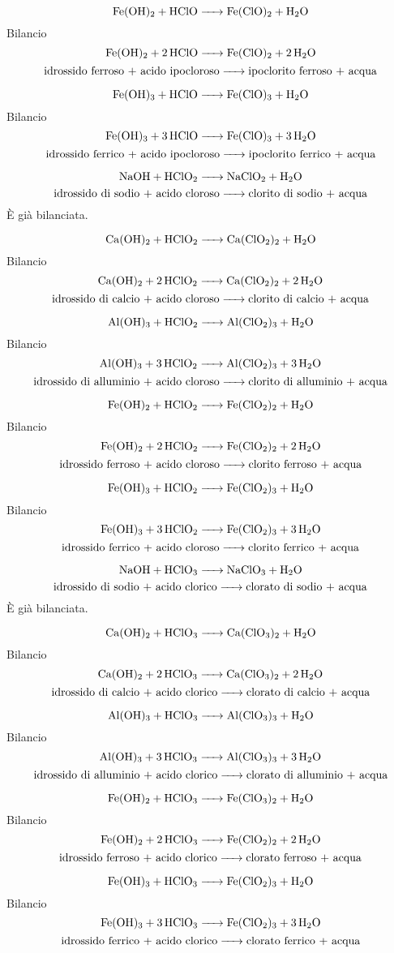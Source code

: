 $$\ce{Fe(OH)_2 + HClO -> Fe(ClO)_2 + H_2O}$$Bilancio
$$\ce{Fe(OH)_2 + 2 HClO -> Fe(ClO)_2 + 2 H_2O}$$
$$\text{idrossido ferroso + acido ipocloroso}\ce{->}\text{ipoclorito ferroso + acqua}$$

$$\ce{Fe(OH)_3 + HClO -> Fe(ClO)_3 + H_2O}$$Bilancio
$$\ce{Fe(OH)_3 + 3 HClO -> Fe(ClO)_3 + 3 H_2O}$$
$$\text{idrossido ferrico + acido ipocloroso}\ce{->}\text{ipoclorito ferrico + acqua}$$

$$\ce{NaOH + HClO_2 -> NaClO_2 + H_2O}$$
$$\text{idrossido di sodio + acido cloroso}\ce{->}\text{clorito di sodio + acqua}$$
È già bilanciata.

$$\ce{Ca(OH)_2 + HClO_2 -> Ca(ClO_2)_2 + H_2O}$$Bilancio
$$\ce{Ca(OH)_2 + 2 HClO_2 -> Ca(ClO_2)_2 + 2 H_2O}$$
$$\text{idrossido di calcio + acido cloroso}\ce{->}\text{clorito di calcio + acqua}$$

$$\ce{Al(OH)_3 + HClO_2 -> Al(ClO_2)_3 + H_2O}$$Bilancio
$$\ce{Al(OH)_3 + 3HClO_2 -> Al(ClO_2)_3 + 3H_2O}$$
$$\text{idrossido di alluminio + acido cloroso}\ce{->}\text{clorito di alluminio + acqua}$$

$$\ce{Fe(OH)_2 + HClO_2 -> Fe(ClO_2)_2 + H_2O}$$Bilancio
$$\ce{Fe(OH)_2 + 2 HClO_2 -> Fe(ClO_2)_2 + 2 H_2O}$$
$$\text{idrossido ferroso + acido cloroso}\ce{->}\text{clorito ferroso + acqua}$$

$$\ce{Fe(OH)_3 + HClO_2 -> Fe(ClO_2)_3 + H_2O}$$Bilancio
$$\ce{Fe(OH)_3 + 3 HClO_2 -> Fe(ClO_2)_3 + 3 H_2O}$$
$$\text{idrossido ferrico + acido cloroso}\ce{->}\text{clorito ferrico + acqua}$$

$$\ce{NaOH + HClO_3 -> NaClO_3 + H_2O}$$
$$\text{idrossido di sodio + acido clorico}\ce{->}\text{clorato di sodio + acqua}$$
È già bilanciata.

$$\ce{Ca(OH)_2 + HClO_3 -> Ca(ClO_3)_2 + H_2O}$$Bilancio
$$\ce{Ca(OH)_2 + 2 HClO_3 -> Ca(ClO_3)_2 + 2 H_2O}$$
$$\text{idrossido di calcio + acido clorico}\ce{->}\text{clorato di calcio + acqua}$$

$$\ce{Al(OH)_3 + HClO_3 -> Al(ClO_3)_3 + H_2O}$$Bilancio
$$\ce{Al(OH)_3 + 3 HClO_3 -> Al(ClO_3)_3 + 3 H_2O}$$
$$\text{idrossido di alluminio + acido clorico}\ce{->}\text{clorato di alluminio + acqua}$$

$$\ce{Fe(OH)_2 + HClO_3 -> Fe(ClO_3)_2 + H_2O}$$Bilancio
$$\ce{Fe(OH)_2 + 2HClO_3 -> Fe(ClO_2)_2 + 2H_2O}$$
$$\text{idrossido ferroso + acido clorico}\ce{->}\text{clorato ferroso + acqua}$$

$$\ce{Fe(OH)_3 + HClO_3 -> Fe(ClO_2)_3 + H_2O}$$Bilancio
$$\ce{Fe(OH)_3 + 3 HClO_3 -> Fe(ClO_2)_3 + 3 H_2O}$$
$$\text{idrossido ferrico + acido clorico}\ce{->}\text{clorato ferrico + acqua}$$

